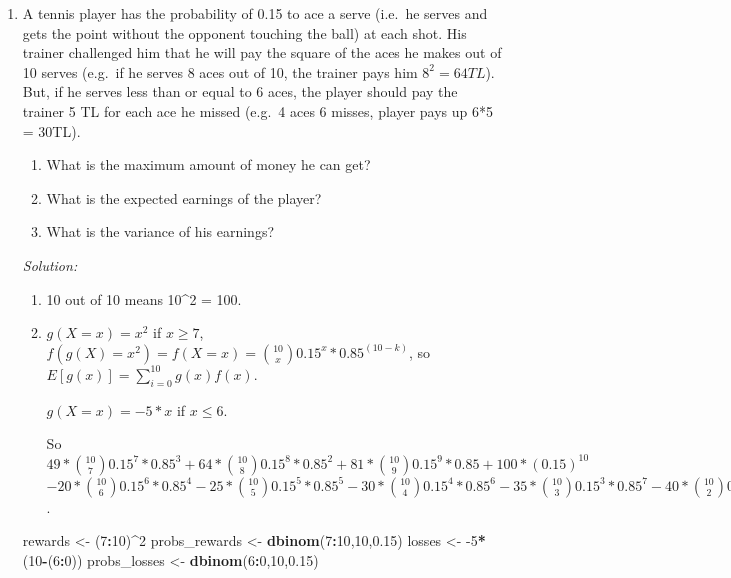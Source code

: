 \documentclass[]{book}
\newenvironment{Shaded}{\begin{snugshade}}{\end{snugshade}}
\newcommand{\DecValTok}[1]{\textcolor[rgb]{0.00,0.00,0.81}{#1}}
\newcommand{\FloatTok}[1]{\textcolor[rgb]{0.00,0.00,0.81}{#1}}
\newcommand{\KeywordTok}[1]{\textcolor[rgb]{0.13,0.29,0.53}{\textbf{#1}}}
\newcommand{\NormalTok}[1]{#1}
\newcommand{\OperatorTok}[1]{\textcolor[rgb]{0.81,0.36,0.00}{\textbf{#1}}}
\newcommand{\StringTok}[1]{\textcolor[rgb]{0.31,0.60,0.02}{#1}}
\providecommand{\tightlist}{%
  \setlength{\itemsep}{0pt}\setlength{\parskip}{0pt}}
\theoremstyle{definition}
\theoremstyle{definition}
\theoremstyle{definition}
\theoremstyle{remark}
\begin{document}
\begin{enumerate}
  \[8-5-4-3\] \[8-5-3-4\] \[8-4-5-3\] \[4-5-3-8\] \[\dots\]
  \[**3-4-5-8**\]

  So, the answer is \(1/(4!) = 1/24\).
\item
  A tennis player has the probability of 0.15 to ace a serve (i.e.~he
  serves and gets the point without the opponent touching the ball) at
  each shot. His trainer challenged him that he will pay the square of
  the aces he makes out of 10 serves (e.g.~if he serves 8 aces out of
  10, the trainer pays him \(8^2 = 64TL\)). But, if he serves less than
  or equal to 6 aces, the player should pay the trainer 5 TL for each
  ace he missed (e.g.~4 aces 6 misses, player pays up 6*5 = 30TL).

  \begin{enumerate}
  \def\labelenumii{\alph{enumii})}
  \tightlist
  \item
    What is the maximum amount of money he can get?
  \item
    What is the expected earnings of the player?
  \item
    What is the variance of his earnings?
  \end{enumerate}

  \emph{Solution:}

  \begin{enumerate}
  \def\labelenumii{\alph{enumii})}
  \item
    10 out of 10 means 10\^{}2 = 100.
  \item
    \(g(X = x) = x^2\) if \(x \geq 7\),
    \(f(g(X) = x^2) = f(X = x) = \binom{10}{x} 0.15^x * 0.85^(10-k)\),
    so \(E[g(x)] = \sum_{i=0}^10 g(x)f(x)\).

    \(g(X = x) = -5*x\) if \(x \leq 6\).

    So
    \(49 * \binom{10}{7} 0.15^7 * 0.85^3 + 64 * \binom{10}{8} 0.15^8 * 0.85^2 + 81 * \binom{10}{9} 0.15^9 * 0.85 + 100 * (0.15)^10\)
    \(-20 * \binom{10}{6} 0.15^6 * 0.85^4 -25 * \binom{10}{5} 0.15^5 * 0.85^5 - 30 * \binom{10}{4} 0.15^4 * 0.85^6 - 35 * \binom{10}{3} 0.15^3 * 0.85^7 - 40 * \binom{10}{2} 0.15^2 * 0.85^8 - 45 * \binom{10}{1} 0.15^1 * 0.85^9 - 50 * 0.85^10 = -42.5TL\).
  \end{enumerate}

\begin{Shaded}
\begin{Highlighting}[]
\NormalTok{rewards <-}\StringTok{ }\NormalTok{(}\DecValTok{7}\OperatorTok{:}\DecValTok{10}\NormalTok{)}\OperatorTok{^}\DecValTok{2}
\NormalTok{probs_rewards <-}\StringTok{ }\KeywordTok{dbinom}\NormalTok{(}\DecValTok{7}\OperatorTok{:}\DecValTok{10}\NormalTok{,}\DecValTok{10}\NormalTok{,}\FloatTok{0.15}\NormalTok{)}
\NormalTok{losses <-}\StringTok{ }\DecValTok{-5}\OperatorTok{*}\NormalTok{(}\DecValTok{10}\OperatorTok{-}\NormalTok{(}\DecValTok{6}\OperatorTok{:}\DecValTok{0}\NormalTok{))}
\NormalTok{probs_losses <-}\StringTok{ }\KeywordTok{dbinom}\NormalTok{(}\DecValTok{6}\OperatorTok{:}\DecValTok{0}\NormalTok{,}\DecValTok{10}\NormalTok{,}\FloatTok{0.15}\NormalTok{)}


\end{Highlighting}
\end{Shaded}
\end{enumerate}
\end{document}
